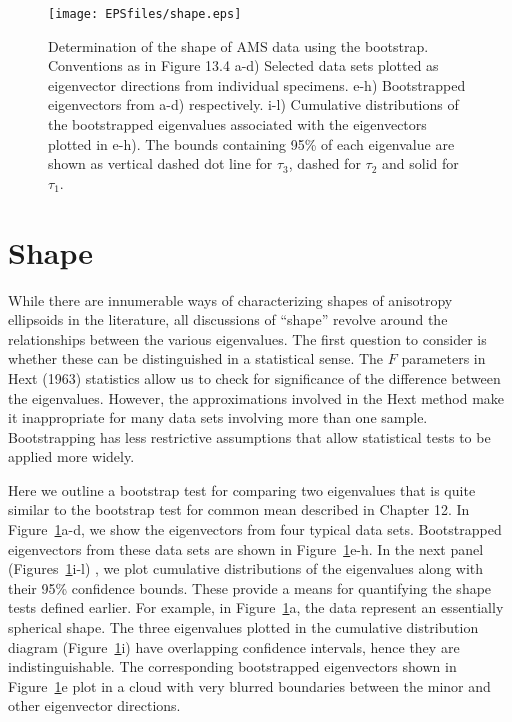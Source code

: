  
 


\begin{figure}[h!tp]
 \centering  \texttt{[image: EPSfiles/shape.eps]}
 \caption{Determination of the shape of AMS data using the bootstrap. Conventions as in Figure 13.4 a-d)  Selected data sets plotted as eigenvector directions from individual specimens.  
e-h) Bootstrapped eigenvectors from a-d) respectively.   i-l) Cumulative distributions  of the bootstrapped eigenvalues 
associated with the eigenvectors plotted in e-h).   The bounds containing 95\% of each eigenvalue are shown as vertical dashed dot line for $\tau_3$, dashed for $\tau_2$ and solid for $\tau_1$.   }
\label{fig:shape}
\end{figure}

\section {Shape}


While there  are innumerable ways of  characterizing shapes of anisotropy
ellipsoids in the literature, all discussions of ``shape'' revolve
around the relationships between the various eigenvalues. 
The first
question to consider is whether these can be distinguished in a
statistical sense. 
The $F$ parameters in Hext (1963)  statistics allow us 
 to check for significance of the difference between the eigenvalues. However, the approximations involved in the
Hext method make it inappropriate for many data sets involving more than one
sample.  Bootstrapping has  less restrictive
assumptions that allow statistical tests to be applied more widely.

Here we outline a 
 bootstrap test for comparing two eigenvalues that is  quite similar to the bootstrap test for
common mean described in Chapter 12. In Figure~\ref{fig:shape}a-d, we
show the eigenvectors from four typical data sets.    Bootstrapped eigenvectors from these data sets   are shown in Figure~\ref{fig:shape}e-h.   In the next panel (Figures~\ref{fig:shape}i-l) , we plot cumulative distributions of the eigenvalues  along with their 95\% confidence bounds.  
   These provide a means for quantifying the shape tests defined
earlier.   For example, in 
 Figure~\ref{fig:shape}a,  the data represent an essentially spherical shape. The  three
eigenvalues plotted in the 
cumulative distribution diagram (Figure~\ref{fig:shape}i)
have overlapping confidence intervals, hence they are
indistinguishable.  The corresponding bootstrapped eigenvectors shown 
in Figure~\ref{fig:shape}e plot in a cloud with very blurred boundaries between the minor and other eigenvector directions.  

